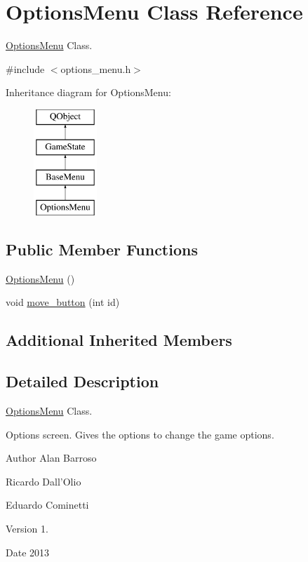 \hypertarget{class_options_menu}{\section{Options\-Menu Class Reference}
\label{class_options_menu}
}


\hyperlink{class_options_menu}{Options\-Menu} Class.  




{\ttfamily \#include $<$options\-\_\-menu.\-h$>$}

Inheritance diagram for Options\-Menu\-:\begin{figure}[H]
\begin{center}
\leavevmode
\includegraphics[height=4.000000cm]{class_options_menu}
\end{center}
\end{figure}
\subsection*{Public Member Functions}
\begin{DoxyCompactItemize}
\item 
\hyperlink{class_options_menu_aa1164b1bc500cc1f53b176ab05b30fe2}{Options\-Menu} ()
\item 
void \hyperlink{class_options_menu_a81bd7ebf73d664c307e7f070e6dc0e7a}{move\-\_\-button} (int id)
\end{DoxyCompactItemize}
\subsection*{Additional Inherited Members}


\subsection{Detailed Description}
\hyperlink{class_options_menu}{Options\-Menu} Class. 

Options screen. Gives the options to change the game options. \begin{DoxyAuthor}{Author}
Alan Barroso 

Ricardo Dall'Olio 

Eduardo Cominetti 
\end{DoxyAuthor}
\begin{DoxyVersion}{Version}
1. 
\end{DoxyVersion}
\begin{DoxyDate}{Date}
2013 
\end{DoxyDate}


